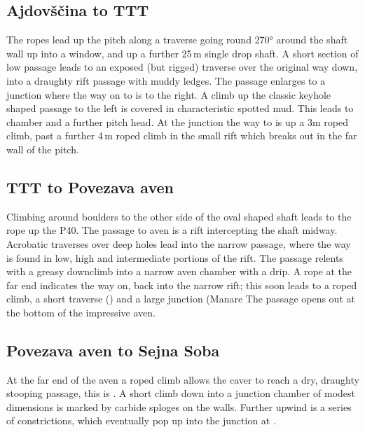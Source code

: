 \subsection{Ajdov\v{s}\v{c}ina to TTT}
The ropes lead up the  pitch along a traverse going round 270° around the shaft wall up into a window, and up a further 25\,m single drop shaft. A short section of low passage leads to an exposed (but rigged) traverse over the original way down, into a draughty rift passage with muddy ledges. The passage enlarges to a junction where the way on to  is to the right. A climb up the classic keyhole shaped passage to the left is covered in characteristic spotted mud. This leads to  chamber and a further pitch head. At the junction the way to  is up a 3m roped climb, past a further 4\,m roped climb in the small rift which breaks out in the far wall of the  pitch.

\subsection{TTT to Povezava aven}
Climbing around boulders to the other side of the oval shaped shaft leads to the rope up the P40. The passage to  aven is a rift intercepting the shaft midway. Acrobatic traverses over deep holes lead into the narrow passage, where the way is found in low, high and intermediate portions of the rift. The passage relents with a greasy downclimb into a narrow aven chamber with a drip. A rope at the far end indicates the way on, back into the narrow rift; this soon leads to a roped climb, a short traverse () and a large junction (Manare The passage opens out at the bottom of the impressive  aven.

\subsection{Povezava aven to Sejna Soba}
At the far end of the aven a roped climb allows the caver to reach a dry, draughty stooping passage, this is . A short climb down into a junction chamber of modest dimensions is marked by carbide sploges on the walls. Further upwind is a series of constrictions, which eventually pop up into the junction at .


